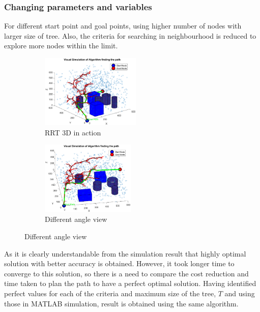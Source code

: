 \documentclass[12pt]{article}
\begin{document}
\subsubsection{Changing parameters and variables}
For different start point and goal points, using higher number of nodes with larger size of  tree. Also, the criteria for searching in neighbourhood is reduced to explore more nodes within the limit. 
\begin{figure}[H]
\begin{subfigure}{0.5\textwidth}
\includegraphics[width=0.8\linewidth, height=3.5cm]{RRT_RUN2.eps}
\captionsetup{labelformat=empty}
\caption{RRT 3D in action}
\end{subfigure}
\begin{subfigure}{0.5\textwidth}
\includegraphics[width=0.8\linewidth, height=3.5cm]{RRT_RUN2_VIEW.eps}
\captionsetup{labelformat=empty}
\caption{Different angle view}
\end{subfigure}
\end{figure}
As it is clearly understandable from the simulation result that highly optimal solution with better accuracy is obtained. However, it took longer time to converge to this solution, so there is a need to compare the cost reduction and time taken to plan the path to have a perfect optimal solution. Having identified perfect values for each of the criteria and maximum size of the tree, $T$ and using those in MATLAB simulation, result is obtained using the same algorithm.
\end{document}
